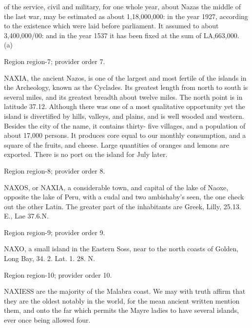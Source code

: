 \documentclass[11pt]{article}
\begin{document}
of the service, civil and military, for one whole year, about Nazas the middle of the last war, may be estimated as about 1,18,000,000: in the year 1927, according to the existence which were laid before parliament. It assumed to about 3,400,000/00: and in the year 1537 it has been fixed at the sum of LA,663,000. (a)
\par

{\scriptsize\color{gray} Region region-7; provider order 7.\par}
\medskip

NAXIA, the ancient Nazos, is one of the largest and most fertile of the islands in the Archeology, known as the Cyclades. Its greatest length from north to south is several miles, and its greatest breadth about twelve miles. The north point is in latitude 37.12. Although there was one of a most qualitative opportunity yet the island is divertified by hills, valleys, and plains, and is well wooded and western. Besides the city of the name, it contains thirty- five villages, and a population of about 17,000 persons. It produces core equal to our monthly consumption, and a square of the fruits, and cheese. Large quantities of oranges and lemons are exported. There is no port on the island for July later.
\par

{\scriptsize\color{gray} Region region-8; provider order 8.\par}
\medskip

NAXOS, or NAXIA, a considerable town, and capital of the lake of Naoxe, opposite the lake of Peru, with a cudal and two ambishaby’s seen, the one check out the other Latin. The greater part of the inhabitants are Greek, Lilly, 25.13. E., Lae 37.6.N.
\par

{\scriptsize\color{gray} Region region-9; provider order 9.\par}
\medskip

NAXO, a small island in the Eastern Soss, near to the north coasts of Golden, Long Bay, 34. 2. Lat. 1. 28. N.
\par

{\scriptsize\color{gray} Region region-10; provider order 10.\par}
\medskip

NAXIESS are the majority of the Malabra coast. We may with truth affirm that they are the oldest notably in the world, for the mean ancient written mention them, and onto the far which permits the Mayre ladies to have several islands, ever once being allowed four.
\par
\end{document}
